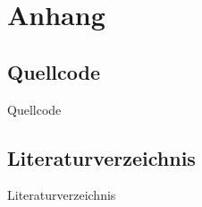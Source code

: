 \chapter{Anhang}
\thispagestyle{fancy} %

\section{Quellcode}
Quellcode
\section{Literaturverzeichnis}
Literaturverzeichnis